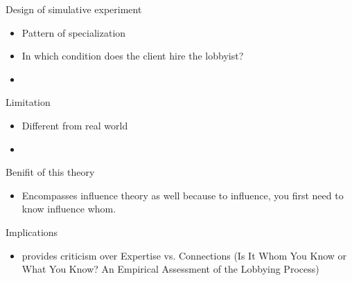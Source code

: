 \documentclass{beamer}
\begin{document}
	\begin{frame}{Design of simulative experiment}
		\begin{itemize}
			\item Pattern of specialization
			\item In which condition does the client hire the lobbyist?
			\item 
		\end{itemize}
	\end{frame}
	
	

	\begin{frame}{Limitation}
		\begin{itemize}
			\item Different from real world
			\item 
		\end{itemize}

	\end{frame}

	\begin{frame}{Benifit of this theory}
		\begin{itemize}
			\item Encompasses influence theory as well because to influence, you first need to know influence whom.
		\end{itemize}
	\end{frame}


	\begin{frame}{Implications}
		\begin{itemize}
			\item provides criticism over Expertise vs. Connections (Is It Whom You Know or What You Know?
			An Empirical Assessment of the Lobbying Process)
		\end{itemize}
	\end{frame}
\end{document}
